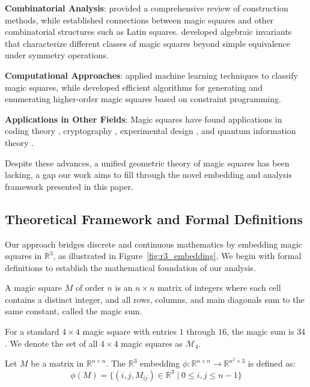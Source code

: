 \textbf{Combinatorial Analysis}: \cite{ahmed2004construction} provided a comprehensive review of construction methods, while \cite{xin2019} established connections between magic squares and other combinatorial structures such as Latin squares. \cite{nordgren2011} developed algebraic invariants that characterize different classes of magic squares beyond simple equivalence under symmetry operations.

\textbf{Computational Approaches}: \cite{bellew2015} applied machine learning techniques to classify magic squares, while \cite{chen2018} developed efficient algorithms for generating and enumerating higher-order magic squares based on constraint programming.

\textbf{Applications in Other Fields}: Magic squares have found applications in coding theory \cite{drisko1997}, cryptography \cite{sastry2013}, experimental design \cite{bailey2017combinatorics}, and quantum information theory \cite{goyeneche2020}.

Despite these advances, a unified geometric theory of magic squares has been lacking, a gap our work aims to fill through the novel embedding and analysis framework presented in this paper.

\subsection{Theoretical Framework and Formal Definitions}
\label{sec:framework}

Our approach bridges discrete and continuous mathematics by embedding magic squares in $\mathbb{R}^3$, as illustrated in Figure~\ref{fig:r3_embedding}. We begin with formal definitions to establish the mathematical foundation of our analysis.

\begin{definition}
A magic square $M$ of order $n$ is an $n \times n$ matrix of integers where each cell contains a distinct integer, and all rows, columns, and main diagonals sum to the same constant, called the magic sum.
\end{definition}

For a standard $4 \times 4$ magic square with entries $1$ through $16$, the magic sum is $34$. We denote the set of all $4 \times 4$ magic squares as $\mathcal{M}_4$.

\begin{definition}
Let $M$ be a matrix in $\mathbb{R}^{n \times n}$. The $\mathbb{R}^3$ embedding $\phi: \mathbb{R}^{n \times n} \rightarrow \mathbb{R}^{n^2 \times 3}$ is defined as:
\[\phi(M) = \{(i, j, M_{ij}) \in \mathbb{R}^3 \mid 0 \leq i, j \leq n-1\}\]
\end{definition}

